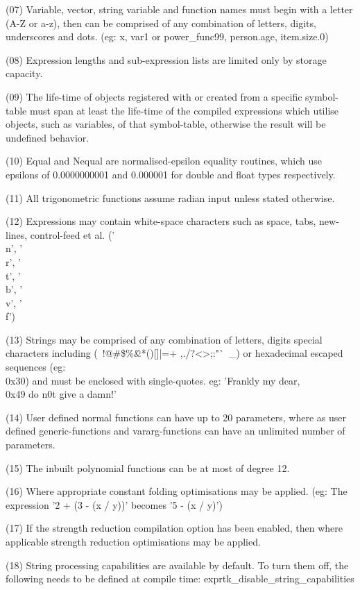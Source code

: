 {(07) Variable, vector, string variable and function names must begin
with  a letter  (A-Z or  a-z), then  can be  comprised of  any
combination of letters, digits,  underscores and dots. (eg:  x,
var1 or power\_func99, person.age, item.size.0)

(08) Expression lengths and sub-expression lists are limited only by
storage capacity.

(09) The  life-time of  objects registered  with or  created from  a
specific symbol-table must span  at least the life-time  of the
compiled expressions which utilise objects, such as  variables,
of that  symbol-table, otherwise  the result  will be undefined
behavior.

(10) Equal  and  Nequal  are  normalised-epsilon  equality routines,
which use epsilons of 0.0000000001 and 0.000001 for double  and
float types respectively.

(11) All trigonometric functions  assume radian input  unless stated
otherwise.

(12) Expressions may contain  white-space characters such  as space,
tabs, new-lines, control-feed et al.
('\\n', '\\r', '\\t', '\\b', '\\v', '\\f')

(13) Strings may be comprised of any combination of letters, digits
special characters including (~!@\#\$\%\^\&*()[]|=+ ,./?<>;:"`~\_) or
hexadecimal escaped sequences (eg: \\0x30) and must be enclosed
with single-quotes.
eg: 'Frankly my dear, \\0x49 do n0t give a damn!'

(14) User defined  normal functions  can have  up to  20 parameters,
where as  user defined  generic-functions and  vararg-functions
can have an unlimited number of parameters.

(15) The inbuilt polynomial functions can be at most of degree 12.

(16) Where appropriate constant folding optimisations may be applied.
(eg: The expression '2 + (3 - (x / y))' becomes '5 - (x / y)')

(17) If the strength reduction compilation option has been enabled,
then where applicable strength reduction optimisations may be
applied.

(18) String  processing capabilities  are available  by default.  To
turn them  off, the  following needs  to be  defined at compile
time: exprtk\_disable\_string\_capabilities

}
